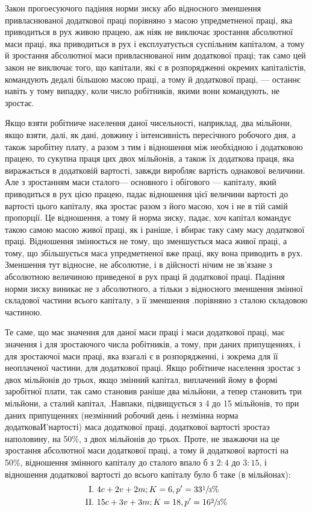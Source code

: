 \documentclass[12pt, a4paper, final]{memoir}
\begin{document}
Закон прогоесуючого падіння норми зиску або відносного зменшення привласнюваної додаткової праці порівняно з масою упредметненої праці, яка приводиться в рух живою працею, аж ніяк не виключає зростання абсолютної маси праці, яка приводиться в рух і експлуатується суспільним капіталом, а тому й зростання абсолютної маси привласнюваної ним додаткової праці; так само цей закон не виключає того, що капітали, які є в розпорядженні окремих капіталістів, командують дедалі більшою масою праці, а тому й додаткової праці, — останнє навіть у тому випадку, коли число робітників, якими вони командують, не зростає.

Якщо взяти робітниче населення даної чисельності, наприклад, два мільйони, якщо взяти, далі, як дані, довжину і інтенсивність пересічного робочого дня, а також заробітну плату, а разом з тим і відношення між необхідною і додатковою працею, то сукупна праця цих двох мільйонів, а також їх додаткова праця, яка виражається в додатковій вартості, завжди виробляє вартість однакової величини. Але з зростанням маси сталого— основного і обігового — капіталу, який приводиться в рух цією працею, падає відношення цієї величини вартості до вартості цього капіталу, яка зростає разом з його масою, хоч і не в тій самій пропорції. Це відношення, а тому й норма зиску, падає, хоч капітал командує такою самою масою живої праці, як і раніше, і вбирає таку саму масу додаткової праці. Відношення змінюється не тому, що зменшується маса живої праці, а тому, що збільшується маса упредметненої вже праці, яку вона приводить в рух. Зменшення тут відносне, не абсолютне, і в дійсності нічим не зв’язане з абсолютною величиною приведеної в рух праці й додаткової праці. Падіння норми зиску виникає не з абсолютного, а тільки з відносного зменшення змінної складової частини всього капіталу, з її зменшення .порівняно з сталою складовою частиною.

Те саме, що має значення для даної маси праці і маси додаткової праці, має значення і для зростаючого числа робітників, а тому, при даних припущеннях, і для зростаючої маси праці, яка взагалі є в розпорядженні, і зокрема для її неоплаченої частини, для додаткової праці. Якщо робітниче населення зростає з двох мільйонів до трьох, якщо змінний капітал, виплачений йому в формі заробітної плати, так само становив раніше два мільйони, а тепер становить три мільйони, а сталий капітал, .Навпаки, підвищується з 4 до 15 мільйонів, то при даних припущеннях (незмінний робочий день і незмінна норма додатковаИ'нартості) маса додаткової праці, додаткової вартості зростаэ наполовину, на 50\%, з двох мільйонів до трьох. Проте, не зважаючи на це зростання абсолютної маси додаткової праці, а тому й додаткової вартості на 50\%, відношення змінного капіталу до сталого впало б з $2:4$ до $3:15$, і відношення додаткової вартості до всього капіталу було б таке (в мільйонах):
\begin{align*}
\text{I. } & 4c+2v+2m; K=6, p'=33\sfrac{1}{3}\%\\
\text{II. } & 15c+3v+3m; K=18, p'=16\sfrac{2}{3}\%
\end{align*}
\end{document}
